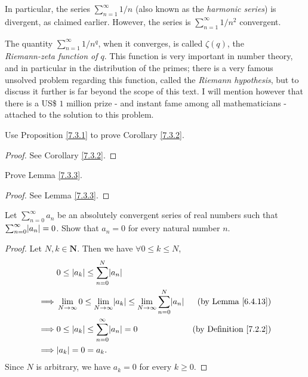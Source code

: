 \begin{note}
    In particular, the series \(\sum_{n = 1}^\infty 1 / n\) (also known as the \emph{harmonic series}) is divergent, as claimed earlier.
    However, the series is \(\sum_{n = 1}^\infty 1 / n^2\) convergent.
\end{note}

\begin{remark}\label{7.3.8}
    The quantity \(\sum_{n = 1}^\infty 1 / n^q\), when it converges, is called \(\zeta(q)\), the \\
    \emph{Riemann-zeta function of \(q\)}.
    This function is very important in number theory, and in particular in the distribution of the primes;
    there is a very famous unsolved problem regarding this function, called the \emph{Riemann hypothesis}, but to discuss it further is far beyond the scope of this text.
    I will mention however that there is a US\$ \(1\) million prize
    - and instant fame among all mathematicians -
    attached to the solution to this problem.
\end{remark}

\exercisesection

\begin{exercise}\label{ex 7.3.1}
    Use Proposition \ref{7.3.1} to prove Corollary \ref{7.3.2}.
\end{exercise}

\begin{proof}
    See Corollary \ref{7.3.2}.
\end{proof}

\begin{exercise}\label{ex 7.3.2}
    Prove Lemma \ref{7.3.3}.
\end{exercise}

\begin{proof}
    See Lemma \ref{7.3.3}.
\end{proof}

\begin{exercise}\label{ex 7.3.3}
    Let \(\sum_{n = 0}^\infty a_n\) be an absolutely convergent series of real numbers such that \(\sum_{n = 0}^\infty \abs*{a_n} = 0\).
    Show that \(a_n = 0\) for every natural number \(n\).
\end{exercise}

\begin{proof}
    Let \(N, k \in \mathbf{N}\).
    Then we have \(\forall 0 \leq k \leq N\),
    \begin{align*}
                 & 0 \leq \abs*{a_k} \leq \sum_{n = 0}^N \abs*{a_n}                                                                                                  \\
        \implies & \lim_{N \to \infty} 0 \leq \lim_{N \to \infty} \abs*{a_k} \leq \lim_{N \to \infty} \sum_{n = 0}^N \abs*{a_n} & \text{(by Lemma \ref{6.4.13})}     \\
        \implies & 0 \leq \abs*{a_k} \leq \sum_{n = 0}^\infty \abs*{a_n} = 0                                                    & \text{(by Definition \ref{7.2.2})} \\
        \implies & \abs*{a_k} = 0 = a_k.
    \end{align*}
    Since \(N\) is arbitrary, we have \(a_k = 0\) for every \(k \geq 0\).
\end{proof}